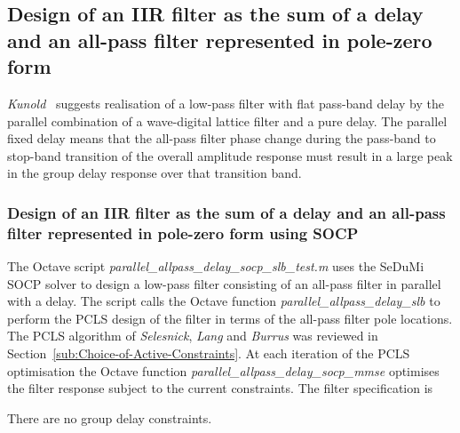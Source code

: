 \documentclass[a4paper,twoside,10pt,english]{report}
\begin{document}
\subsection{\label{sec:Design-IIR-filter-sum-delay-all-pass-filter-pole-zero}Design of an IIR filter as the sum of a delay and an all-pass filter represented in pole-zero form}
\emph{Kunold}~\cite{Kunold_LinearPhaseRealizationWaveDigitalFilters} suggests
realisation of a low-pass filter with flat pass-band delay by the parallel
combination of a wave-digital lattice filter and a pure delay. The parallel
fixed delay means that the all-pass filter phase change during the pass-band
to stop-band transition of the overall amplitude response must result in a
large peak in the group delay response over that transition band. 

\subsubsection{\label{sec:Design-IIR-filter-sum-delay-all-pass-filter-pole-zero-SOCP}Design of an IIR filter as the sum of a delay and an all-pass filter represented in pole-zero form using SOCP}
The Octave script \emph{parallel\_allpass\_delay\_socp\_slb\_test.m} uses the
SeDuMi SOCP solver to design a low-pass filter consisting of an all-pass
filter in parallel with a delay. The script calls the Octave function
\emph{parallel\_allpass\_delay\_slb} to perform the PCLS design of the filter
in terms of the all-pass filter pole locations. The PCLS algorithm of
\emph{Selesnick}, \emph{Lang} and \emph{Burrus} was reviewed in
Section~\ref{sub:Choice-of-Active-Constraints}. At each iteration of the PCLS
optimisation the Octave function \emph{parallel\_allpass\_delay\_socp\_mmse}
optimises the filter response subject to the current constraints. The filter
specification is
\begin{small}

\end{small}
There are no group delay constraints.
\end{document}
